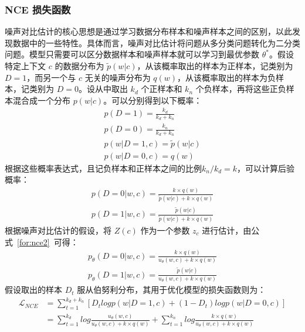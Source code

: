 \subsubsection{NCE 损失函数}
噪声对比估计的核心思想是通过学习数据分布样本和噪声样本之间的区别\cite{mnih_fast_2012}，以此发现数据中的一些特性。具体而言，噪声对比估计将问题从多分类问题转化为二分类问题。模型只需要可以区分数据样本和噪声样本就可以学习到最优参数 $\theta^*$。假设特定上下文 $c$ 的数据分布为 $\tilde{p}(w|c)$，从该概率取出的样本为正样本，记类别为 $D = 1$，而另一个与 $c$ 无关的噪声分布为 $q(w)$，从该概率取出的样本为负样本，记类别为 $D = 0$。设从中取出 $k_d$ 个正样本和 $k_n$ 个负样本，再将这些正负样本混合成一个分布 $p(w|c)$。可以分别得到以下概率：
\begin{equation}
    \begin{aligned}
        p(D = 1) = \frac{k_d}{k_d + k_n} \\
        p(D = 0) = \frac{k_n}{k_d + k_n} \\
        p(w|D=1,c) = \tilde{p}(w|c) \\
        p(w|D=0,c) = q(w)
    \end{aligned}
\end{equation}
根据这些概率表达式，且记负样本和正样本之间的比例$k_n/k_d = k$，可以计算后验概率：
\begin{equation}
    \begin{aligned}
        p(D=0|w,c) = \frac{k \times q(w)}{\tilde{p}(w|c) + k \times q(w)} \\
        p(D=1|w,c) = \frac{\tilde{p}(w|c)}{\tilde{p}(w|c) + k \times q(w)}
    \end{aligned}
\end{equation}
根据噪声对比估计的假设，将 $Z(c)$ 作为一个参数 $z_c$ 进行估计，由公式~\ref{for:nce2}~可得：
\begin{equation}
    \begin{aligned}
        p_{\theta}(D=0|w,c) = \frac{k \times q(w)}{u_{\theta}(w,c) + k \times q(w)} \\
        p_{\theta}(D=1|w,c) = \frac{\tilde{p}(w|c)}{u_{\theta}(w,c) + k \times q(w)}
    \end{aligned}
\end{equation}
假设取出的样本 $D_t$ 服从伯努利分布，其用于优化模型的损失函数则为：
\begin{equation}
    \begin{aligned}
        \mathcal{L}_{NCE} & = \sum_{t=1}^{k_d + k_n} [D_tlog p(w|D=1,c) + (1-D_t)log p(w|D=0,c)] \\
        & = \sum_{t=1}^{k_d}log\frac{u_{\theta}(w,c)}{u_{\theta}(w,c) + k \times q(w)} + \sum_{t=1}^{k_n}log\frac{k \times q(w)}{u_{\theta}(w,c) + k \times q(w)} \label{for:nce3}
    \end{aligned}
\end{equation} 
